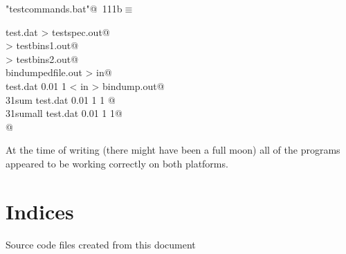 \documentclass[10pt,a4paper,notitlepage]{article}
\begin{document}
\begin{flushleft} \small
\begin{minipage}{\linewidth}\label{scrap137}\raggedright\small
{} \verb@"testcommands.bat"@\nobreak\ {\footnotesize {111b}}$\equiv$
\vspace{-1ex}
\begin{list}{}{} \item
\mbox{}\verb@testspec test.dat > testspec.out@\\
\mbox{}         > testbins1.out@\\
\mbox{}         > testbins2.out@\\
\mbox{}\verb@echo bindumpedfile.out > in@\\
\mbox{}\verb@bindump test.dat 0.01 1  < in > bindump.out@\\
\mbox{}\verb@id31sum test.dat 0.01 1 1 @\\
\mbox{}\verb@id31sumall test.dat 0.01 1 1@\\
\mbox{}\verb@                                                                             @{\NWsep}
\end{list}
\vspace{-1.5ex}
\footnotesize
\begin{list}{}{\setlength{\itemsep}{-\parsep}\setlength{\itemindent}{-\leftmargin}}

\item{}
\end{list}
\end{minipage}\vspace{4ex}
\end{flushleft}
At the time of writing (there might have been a full moon) all of the programs
appeared to be working correctly on both platforms.


\section{Indices}
Source code files created from this document
\end{document}
